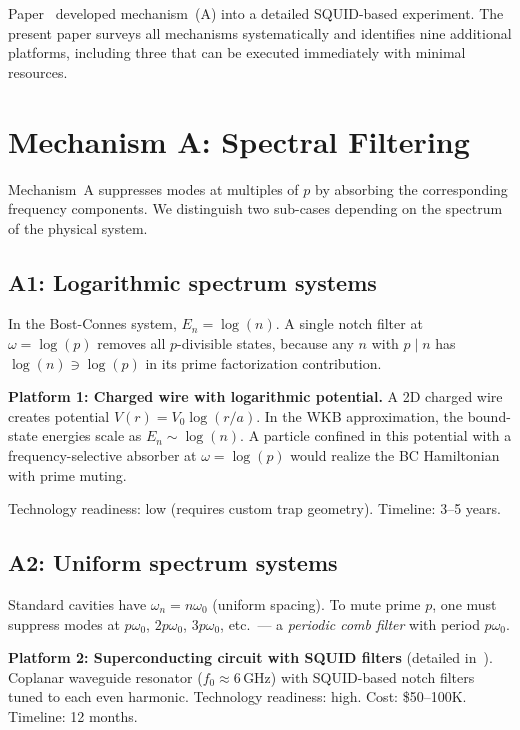 \documentclass[11pt,a4paper]{article}
\begin{document}
Paper~\cite{paper_A} developed mechanism~(A) into a detailed
SQUID-based experiment. The present paper surveys all mechanisms
systematically and identifies nine additional platforms, including
three that can be executed immediately with minimal resources.

\section{Mechanism A: Spectral Filtering}
\label{sec:mech_a}

Mechanism~A suppresses modes at multiples of $p$ by absorbing
the corresponding frequency components. We distinguish two
sub-cases depending on the spectrum of the physical system.

\subsection{A1: Logarithmic spectrum systems}

In the Bost-Connes system, $E_n = \log(n)$. A single notch
filter at $\omega = \log(p)$ removes all $p$-divisible states,
because any $n$ with $p \mid n$ has $\log(n) \ni \log(p)$ in
its prime factorization contribution.

\textbf{Platform 1: Charged wire with logarithmic potential.}
A 2D charged wire creates potential $V(r) = V_0 \log(r/a)$.
In the WKB approximation, the bound-state energies scale as
$E_n \sim \log(n)$. A particle confined in this potential with
a frequency-selective absorber at $\omega = \log(p)$ would
realize the BC Hamiltonian with prime muting.

Technology readiness: low (requires custom trap geometry).
Timeline: 3--5 years.

\subsection{A2: Uniform spectrum systems}

Standard cavities have $\omega_n = n\omega_0$ (uniform spacing).
To mute prime $p$, one must suppress modes at $p\omega_0$,
$2p\omega_0$, $3p\omega_0$, etc.\ --- a \emph{periodic comb filter}
with period $p\omega_0$.

\textbf{Platform 2: Superconducting circuit with SQUID filters}
(detailed in~\cite{paper_A}). Coplanar waveguide resonator
($f_0 \approx 6$\,GHz) with SQUID-based notch filters tuned to
each even harmonic. Technology readiness: high.
Cost: \$50--100K. Timeline: 12 months.
\end{document}
